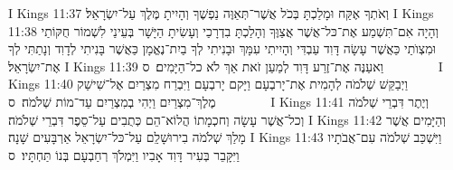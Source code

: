 I Kings 11:37	וְאֹתְךָ אֶקַּח וּמָלַכְתָּ בְּכֹל אֲשֶׁר־תְּאַוֶּה נַפְשֶׁךָ וְהָיִיתָ מֶּלֶךְ עַל־יִשְׂרָאֵל׃
I Kings 11:38	וְהָיָה אִם־תִּשְׁמַע אֶת־כּל־אֲשֶׁר אֲצַוֶּךָ וְהָלַכְתָּ בִדְרָכַי וְעָשִׂיתָ הַיָּשָׁר בְּעֵינַי לִשְׁמוֹר חֻקּוֹתַי וּמִצְוֺתַי כַּאֲשֶׁר עָשָׂה דָּוִד עַבְדִּי וְהָיִיתִי עִמָּךְ וּבָנִיתִי לְךָ בַיִת־נֶאֱמָן כַּאֲשֶׁר בָּנִיתִי לְדָוִד וְנָתַתִּי לְךָ אֶת־יִשְׂרָאֵל׃
I Kings 11:39	וַאעַנֶּה אֶת־זֶרַע דָּוִד לְמַעַן זֹאת אַךְ לֹא כל־הַיָּמִים׃ {ס}        
I Kings 11:40	וַיְבַקֵּשׁ שְׁלֹמֹה לְהָמִית אֶת־יָרבְעָם וַיָּקם יָרבְעָם וַיִּבְרַח מִצְרַיִם אֶל־שִׁישַׁק מֶלֶךְ־מִצְרַיִם וַיְהִי בְמִצְרַיִם עַד־מוֹת שְׁלֹמֹה׃ {ס}        
I Kings 11:41	וְיֶתֶר דִּבְרֵי שְׁלֹמֹה וְכל־אֲשֶׁר עָשָׂה וְחכְמָתוֹ הֲלוֹא־הֵם כְּתֻבִים עַל־סֵפֶר דִּבְרֵי שְׁלֹמֹה׃
I Kings 11:42	וְהַיָּמִים אֲשֶׁר מָלַךְ שְׁלֹמֹה בִירוּשָׁלַ͏ִם עַל־כּל־יִשְׂרָאֵל אַרְבָּעִים שָׁנָה׃
I Kings 11:43	וַיִּשְׁכַּב שְׁלֹמֹה עִם־אֲבֹתָיו וַיִּקָּבֵר בְּעִיר דָּוִד אָבִיו וַיִּמְלֹךְ רְחַבְעָם בְּנוֹ תַּחְתָּיו׃ {ס}        
